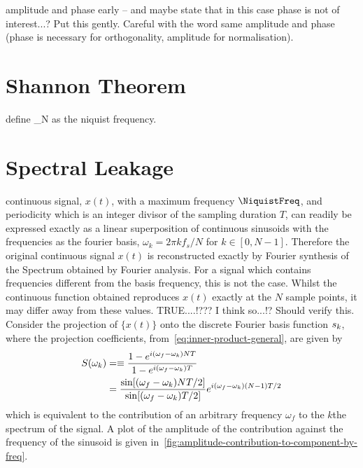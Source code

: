 amplitude and phase early -- and maybe state that in this case phase is not of
interest...? Put this gently. Careful with the word %
same amplitude and phase (phase is necessary for orthogonality, amplitude for
normalisation).


\section{Shannon Theorem} \NiquistFreq define \omega_N as the niquist frequency.

\section{Spectral Leakage} %
continuous signal, $x(t)$, with a maximum frequency $\NiquistFreq$, and
periodicity which is an integer divisor of the sampling duration $T$, can
readily be expressed exactly as a linear superposition of continuous sinusoids
with the frequencies as the fourier basis, $\omega_k = 2 \pi k f_s / N$ for $k
\in [0,N-1]$. Therefore the original continuous signal $x(t)$ is reconstructed
exactly by Fourier synthesis of the Spectrum obtained by Fourier analysis. For a
signal which contains frequencies different from the basis frequency, this is
not the case. Whilst the continuous function obtained reproduces $x(t)$ exactly
at the $N$ sample points, it may differ away from these values. %
TRUE....!??? I think so...!? Should verify this. Consider the projection of
$\{x(t)\}$ onto the discrete Fourier basis function $s_k$, where the
projection coefficients, from~\eqref{eq:inner-product-general}, are given by
\begin{align*} S(\omega_k) &=\equiv \frac{ 1 - e^{i (\omega_f -
\omega_k) N T} }{1 - e^{i(\omega_f - \omega_k) T}} \\ &= \frac{ \sin[(\omega_f -
\omega_k)N T / 2]}{\sin[(\omega_f - \omega_k) T / 2]} e^{i (\omega_f - \omega_k)
(N - 1) T /2}
\end{align*} which is equivalent to the contribution of an arbitrary frequency
$\omega_f$ to the $k$the spectrum of the signal. A plot of the amplitude of the
contribution against the frequency of the sinusoid is given
in~\ref{fig:amplitude-contribution-to-component-by-freq}.
